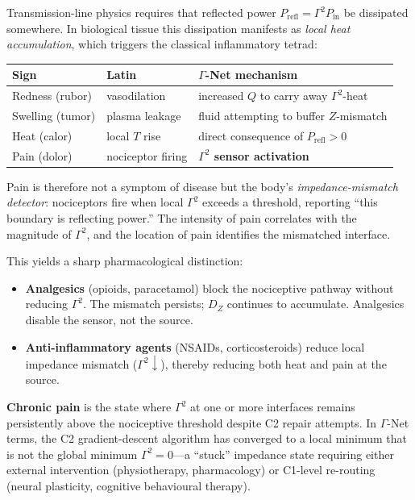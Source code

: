 \documentclass[aps,pre,twocolumn,superscriptaddress,floatfix]{revtex4-2}
\begin{document}
\begin{remark}
\label{rem:pain-as-gamma-sensor}
Transmission-line physics requires that reflected power
$P_{\mathrm{refl}} = \Gamma^2 P_{\mathrm{in}}$
be dissipated somewhere.
In biological tissue this dissipation manifests as
\emph{local heat accumulation}, which triggers the
classical inflammatory tetrad:
\begin{center}
\renewcommand{\arraystretch}{1.15}
\begin{tabular}{@{}lll@{}}
\toprule
Sign & Latin & $\Gamma$-Net mechanism \\
\midrule
Redness (rubor) & vasodilation & increased $Q$ to
  carry away $\Gamma^2$-heat \\
Swelling (tumor) & plasma leakage & fluid attempting
  to buffer $Z$-mismatch \\
Heat (calor) & local $T$ rise & direct consequence of
  $P_{\mathrm{refl}} > 0$ \\
Pain (dolor) & nociceptor firing & \textbf{$\Gamma^2$
  sensor activation} \\
\bottomrule
\end{tabular}
\end{center}

Pain is therefore not a symptom of disease but the
body's \emph{impedance-mismatch detector}: nociceptors
fire when local $\Gamma^2$ exceeds a threshold,
reporting ``this boundary is reflecting power.''
The intensity of pain correlates with the magnitude
of $\Gamma^2$, and the location of pain identifies
the mismatched interface.

This yields a sharp pharmacological distinction:
\begin{itemize}
  \item \textbf{Analgesics} (opioids, paracetamol)
    block the nociceptive pathway without reducing
    $\Gamma^2$.  The mismatch persists;
    $D_Z$ continues to accumulate.
    Analgesics disable the sensor, not the source.
  \item \textbf{Anti-inflammatory agents}
    (NSAIDs, corticosteroids) reduce local
    impedance mismatch ($\Gamma^2 \downarrow$),
    thereby reducing both heat and pain at the
    source.
\end{itemize}

\textbf{Chronic pain} is the state where $\Gamma^2$
at one or more interfaces remains persistently above
the nociceptive threshold despite C2 repair attempts.
In $\Gamma$-Net terms, the C2 gradient-descent
algorithm has converged to a local minimum that is
not the global minimum $\Gamma^2 = 0$---a ``stuck''
impedance state requiring either external intervention
(physiotherapy, pharmacology) or C1-level re-routing
(neural plasticity, cognitive behavioural therapy).
\end{remark}
\end{document}

